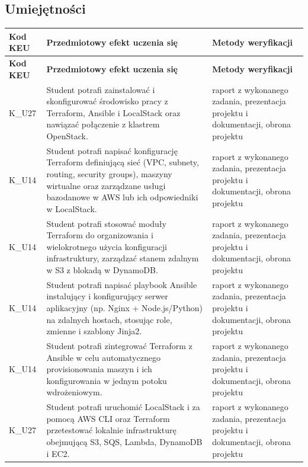 \documentclass[12pt, a4paper]{article}
\newcommand{\thdrule}{\noalign{\global\setlength{\extrarowheight}{0pt}}}
\newcommand{\thdend}{\noalign{\global\setlength{\extrarowheight}{3pt}}}
\begin{document}
\subsection*{Umiejętności}
{\scriptsize
\begin{longtable}{m{1.6cm}m{9.0cm}m{4.2cm}}
\thdrule\toprule
\rowcolor{pjatkRed} {\color{white}\footnotesize\textbf{\vphantom{Ag}Kod KEU}} & {\color{white}\footnotesize\textbf{\vphantom{Ag}Przedmiotowy efekt uczenia się}} & {\color{white}\footnotesize\textbf{\vphantom{Ag}Metody weryfikacji}} \\
\midrule\thdend
\endfirsthead
\thdrule\toprule
\rowcolor{pjatkRed} {\color{white}\footnotesize\textbf{\vphantom{Ag}Kod KEU}} & {\color{white}\footnotesize\textbf{\vphantom{Ag}Przedmiotowy efekt uczenia się}} & {\color{white}\footnotesize\textbf{\vphantom{Ag}Metody weryfikacji}} \\
\midrule\thdend
\endhead
  \rowcolor{tableRowLight} K\_U27 & Student potrafi zainstalować i skonfigurować środowisko pracy z Terraform, Ansible i LocalStack oraz nawiązać połączenie z klastrem OpenStack. & raport z wykonanego zadania, prezentacja projektu i dokumentacji, obrona projektu \\
  \rowcolor{tableRowAlt} K\_U14 & Student potrafi napisać konfigurację Terraform definiującą sieć (VPC, subnety, routing, security groups), maszyny wirtualne oraz zarządzane usługi bazodanowe w AWS lub ich odpowiedniki w LocalStack. & raport z wykonanego zadania, prezentacja projektu i dokumentacji, obrona projektu \\
  \rowcolor{tableRowLight} K\_U14 & Student potrafi stosować moduły Terraform do organizowania i wielokrotnego użycia konfiguracji infrastruktury, zarządzać stanem zdalnym w S3 z blokadą w DynamoDB. & raport z wykonanego zadania, prezentacja projektu i dokumentacji, obrona projektu \\
  \rowcolor{tableRowAlt} K\_U14 & Student potrafi napisać playbook Ansible instalujący i konfigurujący serwer aplikacyjny (np. Nginx + Node.js/Python) na zdalnych hostach, stosując role, zmienne i szablony Jinja2. & raport z wykonanego zadania, prezentacja projektu i dokumentacji, obrona projektu \\
  \rowcolor{tableRowLight} K\_U14 & Student potrafi zintegrować Terraform z Ansible w celu automatycznego provisionowania maszyn i ich konfigurowania w jednym potoku wdrożeniowym. & raport z wykonanego zadania, prezentacja projektu i dokumentacji, obrona projektu \\
  \rowcolor{tableRowAlt} K\_U27 & Student potrafi uruchomić LocalStack i za pomocą AWS CLI oraz Terraform przetestować lokalnie infrastrukturę obejmującą S3, SQS, Lambda, DynamoDB i EC2. & raport z wykonanego zadania, prezentacja projektu i dokumentacji, obrona projektu \\

\end{longtable}}
\end{document}
